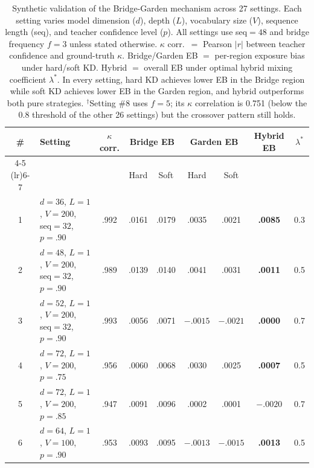 
\begin{table}[t]
\centering
\footnotesize
\setlength{\tabcolsep}{4pt}
\caption{Synthetic validation of the Bridge-Garden mechanism across 27 settings.
Each setting varies model dimension ($d$), depth ($L$), vocabulary size ($V$), sequence length (seq), and teacher confidence level ($p$).
All settings use seq${}=48$ and bridge frequency $f=3$ unless stated otherwise.
$\kappa$ corr.\ $= $ Pearson $|r|$ between teacher confidence and ground-truth $\kappa$.
Bridge/Garden EB $=$ per-region exposure bias under hard/soft KD.
Hybrid $=$ overall EB under optimal hybrid mixing coefficient $\lambda^*$.
In every setting, hard KD achieves lower EB in the Bridge region while soft KD achieves lower EB in the Garden region, and hybrid outperforms both pure strategies.
$^\dagger$Setting \#8 uses $f=5$; its $\kappa$ correlation is 0.751 (below the 0.8 threshold of the other 26 settings) but the crossover pattern still holds.}
\label{tab:27settings}
\begin{tabular}{@{}cl c cc cc c c@{}}
\toprule
\multirow{2}{*}{\#} & \multirow{2}{*}{Setting} & \multirow{2}{*}{$\kappa$ corr.} & \multicolumn{2}{c}{Bridge EB} & \multicolumn{2}{c}{Garden EB} & \multirow{2}{*}{\textbf{Hybrid EB}} & \multirow{2}{*}{$\lambda^*$} \\
\cmidrule(lr){4-5} \cmidrule(lr){6-7}
& & & Hard & Soft & Hard & Soft & & \\
\midrule
1  & $d\!=\!36$, $L\!=\!1$, $V\!=\!200$, seq$\!=\!32$, $p\!=\!.90$ & .992 & .0161 & .0179 & .0035 & .0021 & \textbf{.0085} & 0.3 \\
2  & $d\!=\!48$, $L\!=\!1$, $V\!=\!200$, seq$\!=\!32$, $p\!=\!.90$ & .989 & .0139 & .0140 & .0041 & .0031 & \textbf{.0011} & 0.5 \\
3  & $d\!=\!52$, $L\!=\!1$, $V\!=\!200$, seq$\!=\!32$, $p\!=\!.90$ & .993 & .0056 & .0071 & $-.0015$ & $-.0021$ & \textbf{.0000} & 0.7 \\
\midrule
4  & $d\!=\!72$, $L\!=\!1$, $V\!=\!200$, $p\!=\!.75$ & .956 & .0060 & .0068 & .0030 & .0025 & \textbf{.0007} & 0.5 \\
5  & $d\!=\!72$, $L\!=\!1$, $V\!=\!200$, $p\!=\!.85$ & .947 & .0091 & .0096 & .0002 & .0001 & \textbf{$-.0020$} & 0.7 \\
6  & $d\!=\!64$, $L\!=\!1$, $V\!=\!100$, $p\!=\!.90$ & .953 & .0093 & .0095 & $-.0013$ & $-.0015$ & \textbf{.0013} & 0.5 \\

\end{tabular}
\end{table}
